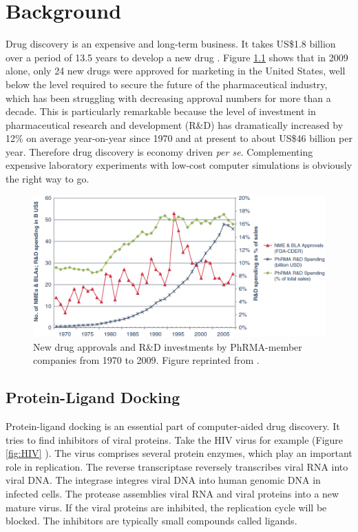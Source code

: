 \chapter{Background}

Drug discovery is an expensive and long-term business. It takes US\$1.8 billion over a period of 13.5 years to develop a new drug \citep{716}. Figure \ref{fig:NewDrugApprovals} \citep{686} shows that in 2009 alone, only 24 new drugs were approved for marketing in the United States, well below the level required to secure the future of the pharmaceutical industry, which has been struggling with decreasing approval numbers for more than a decade. This is particularly remarkable because the level of investment in pharmaceutical research and development (R\&D) has dramatically increased by 12\% on average year-on-year since 1970 and at present to about US\$46 billion per year. Therefore drug discovery is economy driven \textit{per se}. Complementing expensive laboratory experiments with low-cost computer simulations is obviously the right way to go.

\begin{figure}
\centering
\includegraphics[width=\textwidth]{Background/NewDrugApprovals.png}
\caption{New drug approvals and R\&D investments by PhRMA-member companies from 1970 to 2009. Figure reprinted from \citep{686}.}
\label{fig:NewDrugApprovals}
\end{figure}

\section{Protein-Ligand Docking}

Protein-ligand docking is an essential part of computer-aided drug discovery. It tries to find inhibitors of viral proteins. Take the HIV virus for example (Figure \ref{fig:HIV} \citep{296}). The virus comprises several protein enzymes, which play an important role in replication. The reverse transcriptase reversely transcribes viral RNA into viral DNA. The integrase integres viral DNA into human genomic DNA in infected cells. The protease assemblies viral RNA and viral proteins into a new mature virus. If the viral proteins are inhibited, the replication cycle will be blocked. The inhibitors are typically small compounds called ligands.

